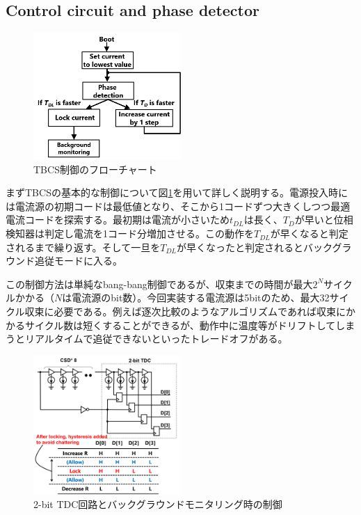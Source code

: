 \documentclass[letterpaper, 10 pt, conference]{ieeeconf}  %
\begin{document}
\subsection{Control circuit and phase detector}
\begin{figure}[!]
\centering
 \includegraphics[width=0.5\textwidth]{figs/flowchart.png}
  \caption{TBCS制御のフローチャート}
\label{flow}
\end{figure}
まずTBCSの基本的な制御について図\ref{flow}を用いて詳しく説明する。電源投入時には電流源の初期コードは最低値となり、そこから1コードずつ大きくしつつ最適電流コードを探索する。最初期は電流が小さいため$t_{DL}$は長く、$T_D$が早いと位相検知器は判定し電流を1コード分増加させる。この動作を$T_{DL}$が早くなると判定されるまで繰り返す。そして一旦を$T_{DL}$が早くなったと判定されるとバックグラウンド追従モードに入る。

この制御方法は単純なbang-bang制御であるが、収束までの時間が最大$2^N$サイクルかかる（$N$は電流源のbit数）。今回実装する電流源は5bitのため、最大32サイクル収束に必要である。例えば逐次比較のようなアルゴリズムであれば収束にかかるサイクル数は短くすることができるが、動作中に温度等がドリフトしてしまうとリアルタイムで追従できないといったトレードオフがある。

\begin{figure}[!]
\centering
 \includegraphics[width=0.5\textwidth]{figs/tdc.png}
  \caption{2-bit TDC回路とバックグラウンドモニタリング時の制御}
\label{tdc}
\end{figure}
\end{document}
